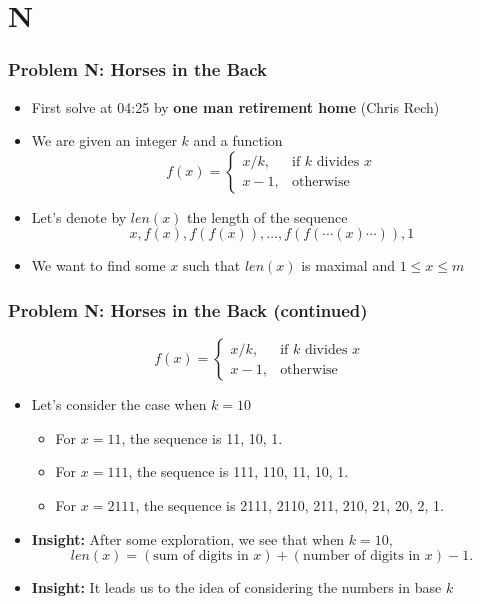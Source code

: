 \section{N}%
\label{sec:n}

\begin{frame}
  \frametitle{Problem N: Horses in the Back}

  \begin{itemize}
    \item First solve at 04:25 by \textbf{one man retirement home} (Chris Rech)
    \item We are given an integer $k$ and a function \[ f(x) = \begin{cases} x/k, & \text{if $k$ divides $x$}\\ x-1, & \text{otherwise} \end{cases}\]
      \item Let's denote by $len(x)$ the length of the sequence \[ x, f(x), f(f(x)), \dots, f(f(\cdots(x)\cdots)), 1 \]
    \item We want to find some $x$ such that $len(x)$ is maximal and $1\le x\le m$
  \end{itemize}
\end{frame}

\begin{frame}
  \frametitle{Problem N: Horses in the Back (continued)}
  \[ f(x) = \begin{cases} x/k, & \text{if $k$ divides $x$}\\ x-1, & \text{otherwise} \end{cases}\]
  \begin{itemize}
    \item Let's consider the case when $k=10$
      \begin{itemize}
        \item For $x=11$, the sequence is 11, 10, 1.
        \item For $x=111$, the sequence is 111, 110, 11, 10, 1.
        \item For $x=2111$, the sequence is 2111, 2110, 211, 210, 21, 20, 2, 1.
      \end{itemize}
    \item \textbf{Insight:} After some exploration, we see that when $k=10$, \[ len(x) = (\text{sum of digits in $x$}) + (\text{number of digits in $x$}) - 1. \]
    \item \textbf{Insight:} It leads us to the idea of considering the numbers in base $k$
  \end{itemize}
\end{frame}

